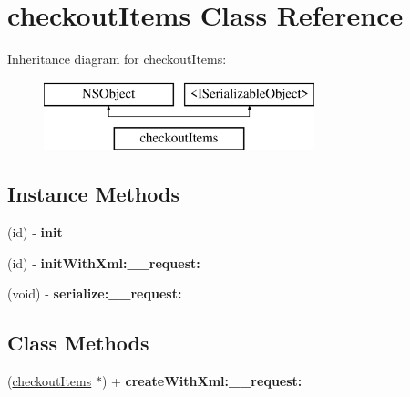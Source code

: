 \hypertarget{interfacecheckout_items}{}\section{checkout\+Items Class Reference}
\label{interfacecheckout_items}
Inheritance diagram for checkout\+Items\+:\begin{figure}[H]
\begin{center}
\leavevmode
\includegraphics[height=2.000000cm]{interfacecheckout_items}
\end{center}
\end{figure}
\subsection*{Instance Methods}
\begin{DoxyCompactItemize}
\item 
\hypertarget{interfacecheckout_items_adfdf0f4b1a377021356d4cadd413a539}{}(id) -\/ {\bfseries init}\label{interfacecheckout_items_adfdf0f4b1a377021356d4cadd413a539}

\item 
\hypertarget{interfacecheckout_items_abc0a0745e2e71edfecc4fe019b377a51}{}(id) -\/ {\bfseries init\+With\+Xml\+:\+\_\+\+\_\+request\+:}\label{interfacecheckout_items_abc0a0745e2e71edfecc4fe019b377a51}

\item 
\hypertarget{interfacecheckout_items_a516bacac7c111eebd48388515a231164}{}(void) -\/ {\bfseries serialize\+:\+\_\+\+\_\+request\+:}\label{interfacecheckout_items_a516bacac7c111eebd48388515a231164}

\end{DoxyCompactItemize}
\subsection*{Class Methods}
\begin{DoxyCompactItemize}
\item 
\hypertarget{interfacecheckout_items_aa384c4e2e90a832c40d304522c65a518}{}(\hyperlink{interfacecheckout_items}{checkout\+Items} $\ast$) + {\bfseries create\+With\+Xml\+:\+\_\+\+\_\+request\+:}\label{interfacecheckout_items_aa384c4e2e90a832c40d304522c65a518}

\end{DoxyCompactItemize}
